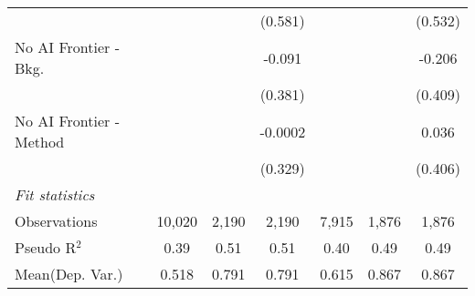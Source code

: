 \begin{tabular}{lcccccc}
                           &              &         & (0.581)       &              &         & (0.532)\\   
   No AI Frontier - Bkg.   &              &         & -0.091        &              &         & -0.206\\   
                           &              &         & (0.381)       &              &         & (0.409)\\   
   No AI Frontier - Method &              &         & -0.0002       &              &         & 0.036\\   
                           &              &         & (0.329)       &              &         & (0.406)\\   
   \midrule
   \emph{Fit statistics}\\
   Observations            & 10,020       & 2,190   & 2,190         & 7,915        & 1,876   & 1,876\\  
   Pseudo R$^2$            & 0.39         & 0.51    & 0.51          & 0.40         & 0.49    & 0.49\\  
Mean(Dep. Var.) & 0.518 & 0.791 & 0.791 & 0.615 & 0.867 & 0.867 \\
   

\end{tabular}
